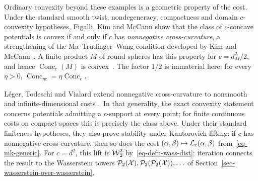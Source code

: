 Ordinary convexity beyond these examples is a geometric property of the cost. Under the standard smooth twist, nondegeneracy, compactness and domain $c$-convexity hypotheses, Figalli, Kim and McCann show that the class of $c$-concave potentials is convex if and only if $c$ has \emph{nonnegative cross-curvature}, a strengthening of the Ma--Trudinger--Wang condition developed by Kim and McCann~\cite{KimMcCann2010,FigalliKimMcCann2011}. A finite product $M$ of round spheres has this property for $c=d_M^2/2$, and hence $\operatorname{Conc}_c(M)$ is convex~\cite{KimMcCann2012,FigalliKimMcCann2013}. The factor $1/2$ is immaterial here: for every $\eta>0$, $\operatorname{Conc}_{\eta c}=\eta\operatorname{Conc}_c$.

L\'eger, Todeschi and Vialard extend nonnegative cross-curvature to nonsmooth and infinite-dimensional costs~\cite{LegerTodeschiVialard2025}. In that generality, the exact convexity statement concerns potentials admitting a $c$-support at every point; for finite continuous costs on compact spaces this is precisely the class above. Under their standard finiteness hypotheses, they also prove stability under Kantorovich lifting: if $c$ has nonnegative cross-curvature, then so does the cost $(\alpha,\beta)\mapsto\mathcal{L}_c(\alpha,\beta)$ from~\eqref{eq-mk-generic}. For $c=d^2$, this lift is $\operatorname{\mathcal{W}}_2^2$ by~\eqref{eq-defn-wass-dist}; iteration connects the result to the Wasserstein towers $\mathcal{P}_2(\mathcal{X}),\mathcal{P}_2(\mathcal{P}_2(\mathcal{X})),\ldots$ of Section~\ref{sec-wasserstein-over-wasserstein}.

